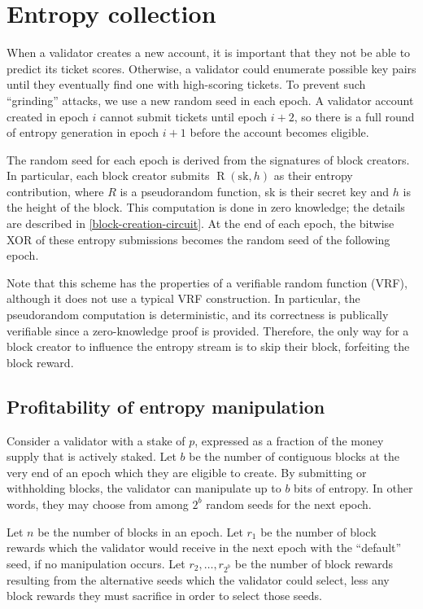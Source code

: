 \section{Entropy collection}
\label{entropy}

When a validator creates a new account, it is important that they not be able to predict its ticket scores. Otherwise, a validator could enumerate possible key pairs until they eventually find one with high-scoring tickets. To prevent such ``grinding'' attacks, we use a new random seed in each epoch. A validator account created in epoch $i$ cannot submit tickets until epoch $i + 2$, so there is a full round of entropy generation in epoch $i + 1$ before the account becomes eligible.

The random seed for each epoch is derived from the signatures of block creators. In particular, each block creator submits $\operatorname{R}(\mathrm{sk}, h)$ as their entropy contribution, where $R$ is a pseudorandom function, sk is their secret key and $h$ is the height of the block. This computation is done in zero knowledge; the details are described in \autoref{block-creation-circuit}. At the end of each epoch, the bitwise XOR of these entropy submissions becomes the random seed of the following epoch.

Note that this scheme has the properties of a verifiable random function (VRF), although it does not use a typical VRF construction. In particular, the pseudorandom computation is deterministic, and its correctness is publically verifiable since a zero-knowledge proof is provided. Therefore, the only way for a block creator to influence the entropy stream is to skip their block, forfeiting the block reward.

\subsection{Profitability of entropy manipulation}

Consider a validator with a stake of $p$, expressed as a fraction of the money supply that is actively staked. Let $b$ be the number of contiguous blocks at the very end of an epoch which they are eligible to create. By submitting or withholding blocks, the validator can manipulate up to $b$ bits of entropy. In other words, they may choose from among $2^b$ random seeds for the next epoch.

Let $n$ be the number of blocks in an epoch. Let $r_1$ be the number of block rewards which the validator would receive in the next epoch with the ``default'' seed, if no manipulation occurs. Let $r_2, \dots, r_{2^b}$ be the number of block rewards resulting from the alternative seeds which the validator could select, less any block rewards they must sacrifice in order to select those seeds.

